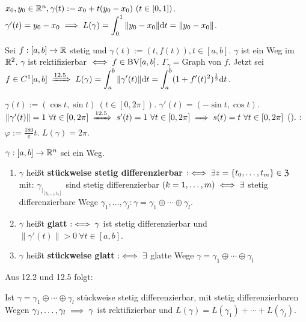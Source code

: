 \documentclass[a4paper,oneside,DIV15,BCOR12mm,chapterprefix=true,headings=onelinechapter]{scrbook}
\begin{document}
\begin{beispiele}
\item $x_0, y_0\in\mathbb{R}^n, \gamma(t):=x_0+t(y_0-x_0)\ (t\in [0,1])$. $\gamma'(t)=y_0-x_0\implies L(\gamma)=\displaystyle\int_0^1\|y_0-x_0\|\text{d}t=\|y_0-x_0\|$.
\item Sei $f:[a,b]\to\mathbb{R}$ stetig und $\gamma(t):=(t, f(t)), t\in[a,b]$. $\gamma$ ist ein Weg im $\mathbb{R}^2$. $\gamma$ ist rektifizierbar $\iff f \in \text{BV}[a,b]$. $\Gamma_\gamma=$Graph von $f$. Jetzt sei $f\in C^1[a,b] \folgtnach{12.5} L(\gamma)=\ds\int_a^b\|\gamma'(t)\|\text{d}t=\ds\int_a^b (1+f'(t)^2)^{\frac{1}{2}}\text{d}t$.
\item $\gamma(t):=(\cos t, \sin t)\ (t\in [0,2\pi])$. $\gamma'(t)=(-\sin t, \cos t)$. $\|\gamma'(t)\|=1\ \forall t\in [0,2\pi]\folgtnach{12.5}s'(t)=1\ \forall t\in[0,2\pi]\folgt s(t)=t\ \forall t\in[0,2\pi]$ (). : $\varphi:=\frac{180}{\pi}t$. $L(\gamma)=2\pi$.
\end{beispiele}

\begin{definition*}
$\gamma:[a,b]\to\mathbb{R}^n$ sei ein Weg.
\begin{enumerate}
\item $\gamma$ heißt \textbf{stückweise stetig differenzierbar} $:\iff\exists z=\{t_0,\ldots,t_m\}\in\mathfrak{Z}$ mit: $\gamma_{|_{[t_{k-1},t_k]}}$ sind stetig differenzierbar $(k=1,\ldots,m)\iff\exists$ stetig differenzierbare Wege $\gamma_1,\ldots,\gamma_l: \gamma=\gamma_1\oplus\cdots\oplus\gamma_l$.
\item $\gamma$ heißt \textbf{glatt} $:\iff \gamma$ ist stetig differenzierbar und $\|\gamma'(t)\|>0\ \forall t\in[a,b]$.
\item $\gamma$ heißt \textbf{stückweise glatt} $:\iff\exists$ glatte Wege $\gamma=\gamma_1\oplus\cdots\oplus\gamma_l$
\end{enumerate}
\end{definition*}

Aus 12.2 und 12.5 folgt:

\begin{satz}
Ist $\gamma=\gamma_1\oplus\cdots\oplus\gamma_l$ stückweise stetig differenzierbar, mit stetig differenzierbaren Wegen $\gamma_1,\ldots,\gamma_l\implies \gamma$ ist rektifizierbar und $L(\gamma)=L(\gamma_1)+\cdots+L(\gamma_l)$.
\end{satz}
\end{document}
